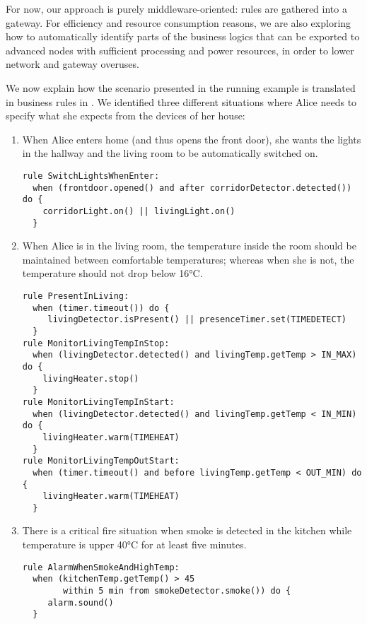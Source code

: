 For now, our approach is purely middleware-oriented: rules are gathered into a gateway. For efficiency and resource consumption reasons, we are also exploring how to automatically identify parts of the business logics that can be exported to advanced nodes with sufficient processing and power resources, in order to lower network and gateway overuses.

We now explain how the scenario presented in the running example is translated in business rules in \IOTDSL. We identified three different situations where Alice needs to specify what she expects from the devices of her house:
\begin{enumerate}
	\item When Alice enters home (and thus opens the front door), she wants the lights in the hallway and the living room to be automatically switched on. 

\begin{lstlisting}[language=iotdsl]
rule SwitchLightsWhenEnter:
  when (frontdoor.opened() and after corridorDetector.detected()) do {
    corridorLight.on() || livingLight.on()
  }
\end{lstlisting}	
	
	\item When Alice is in the living room, the temperature inside the room should be maintained between comfortable temperatures; whereas when she is not, the temperature should not drop below 16°C.
	
	
\begin{lstlisting}[language=iotdsl]
rule PresentInLiving:	
  when (timer.timeout()) do {
     livingDetector.isPresent() || presenceTimer.set(TIMEDETECT)
  }
rule MonitorLivingTempInStop:
  when (livingDetector.detected() and livingTemp.getTemp > IN_MAX) do {
    livingHeater.stop()
  }
rule MonitorLivingTempInStart:
  when (livingDetector.detected() and livingTemp.getTemp < IN_MIN) do {
    livingHeater.warm(TIMEHEAT)
  }
rule MonitorLivingTempOutStart:
  when (timer.timeout() and before livingTemp.getTemp < OUT_MIN) do {
    livingHeater.warm(TIMEHEAT)
  }
\end{lstlisting}
	
	\item There is a critical fire situation when smoke is detected in the kitchen while temperature is upper 40°C for at least five minutes.

\begin{lstlisting}[language=iotdsl]
rule AlarmWhenSmokeAndHighTemp:	
  when (kitchenTemp.getTemp() > 45 
        within 5 min from smokeDetector.smoke()) do {
     alarm.sound()
  }
\end{lstlisting}
\end{enumerate}


